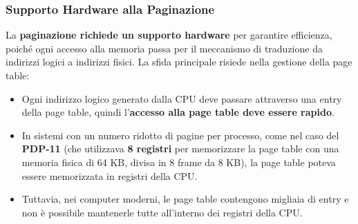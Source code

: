 \subsubsection*{Supporto Hardware alla Paginazione}
La \textbf{paginazione richiede un supporto hardware} per garantire efficienza, poiché ogni accesso alla memoria passa per il meccanismo di traduzione da indirizzi logici a indirizzi fisici. La sfida principale risiede nella gestione della page table:
\begin{itemize}
    \item Ogni indirizzo logico generato dalla CPU deve passare attraverso una entry della page table, quindi l’\textbf{accesso alla page table deve essere rapido}.
    \item In sistemi con un numero ridotto di pagine per processo, come nel caso del \textbf{PDP-11} (che utilizzava \textbf{8 registri} per memorizzare la page table con una memoria fisica di 64 KB, divisa in 8 frame da 8 KB), la page table poteva essere memorizzata in registri della CPU.
    \item Tuttavia, nei computer moderni, le page table contengono migliaia di entry e non è possibile mantenerle tutte all’interno dei registri della CPU.
\end{itemize}

